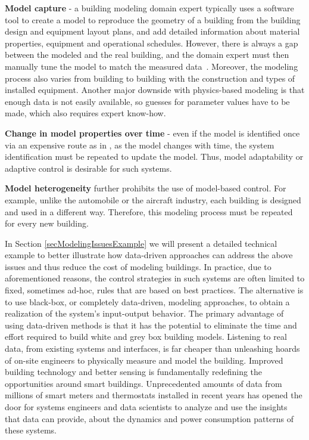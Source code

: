 \begin{enumerate}
	\item \textcolor[rgb]{0,0,1}{\textbf{Model capture} - a building modeling domain expert typically uses a software tool to create a model to reproduce the geometry of a building from the building design and equipment layout plans, and add detailed information about material properties, equipment and operational schedules.
	However, there is always a gap between the modeled and the real building, and the domain expert must then manually tune the model to match the measured data~\cite{New2012}. 
	Moreover, the modeling process also varies from building to building with the construction and types of installed equipment.
	Another major downside with physics-based modeling is that enough data is not easily available, so guesses for parameter values have to be made, which also requires expert know-how.
	\item \textbf{Change in model properties over time} - even if the model is identified once via an expensive route as in \cite{Sturzenegger2016}, as the model changes with time, the system identification must be repeated to update the model. Thus, model adaptability or adaptive control is desirable for such systems.
	\item \textbf{Model heterogeneity} further prohibits the use of model-based control. For example, unlike the automobile or the aircraft industry, each building is designed and used in a different way. Therefore, this modeling process must be repeated for every new building. }
\end{enumerate}

\textcolor[rgb]{0,0,1}{
In Section \ref{secModelingIssuesExample} we will present a detailed technical example to better illustrate how data-driven approaches can address the above issues and thus reduce the cost of modeling buildings. In practice, due to aforementioned reasons, the control strategies in such systems are often limited to fixed, sometimes ad-hoc, rules that are based on best practices. 
The alternative is to use black-box, or completely data-driven, modeling approaches, to obtain a realization of the system's input-output behavior. 
The primary advantage of using data-driven methods is that it has the potential to eliminate the time and effort required to build white and grey box building models. 
Listening to real data, from existing systems and interfaces, is far cheaper than unleashing hoards of on-site engineers to physically measure and model the building. Improved building technology and better sensing is fundamentally redefining the opportunities around smart buildings. 
Unprecedented amounts of data from millions of smart meters and thermostats installed in recent years has opened the door for systems engineers and data scientists to analyze and use the insights that data can provide, about the dynamics and power consumption patterns of these systems. }

